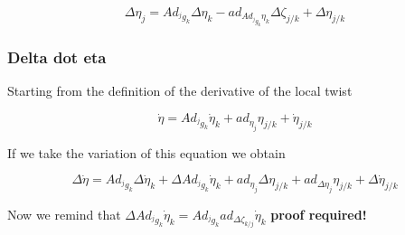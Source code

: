 \documentclass[12pt,a4paper]{book}
\newcommand{\jgk}{\ensuremath{{^j g _k}}}
\renewcommand{\Adjgk}{\ensuremath{Ad_{\jgk}}}
\newcommand{\doteta}{\ensuremath{\dot{\eta}}}
\newcommand{\etajk}{\ensuremath{\eta_{j/k}}}
\begin{document}
\begin{equation}\label{eq: delta eta 4}
	\Delta \eta_j 	= Ad_{^j g_k} \Delta \eta_k - ad_{Ad_{^j g _k}  \eta_k} \Delta \zeta _{j/k} +  \Delta \eta_{j/k} 
\end{equation}


\subsubsection{Delta dot eta}

Starting from the definition of the derivative of the local twist 


\begin{equation}
	\dot{\eta} = \Adjgk \doteta_k + ad_{\eta_j} \etajk + \dot{\eta}_{j/k}
\end{equation}

If we take the variation of this equation we obtain

\begin{equation}
	\Delta \dot{\eta} = \Adjgk \Delta \doteta_k + \Delta \Adjgk \doteta_k +  ad_{\eta_j} \Delta \etajk    +    ad_{\Delta \eta_j} \etajk    + \Delta \dot{\eta}_{j/k}
\end{equation}

Now we remind that $\Delta \Adjgk \doteta_k = \Adjgk{} ad_{\Delta \zeta_{k/j}} \doteta _k$ \color{red}\textbf{proof required!}\color{black}



\end{document}
